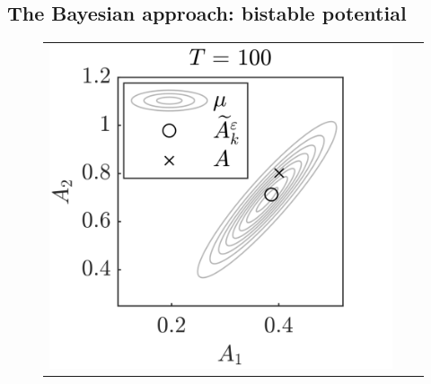 \documentclass[10pt]{article}
\begin{document}
\subsection{The Bayesian approach: bistable potential} \label{sec:Num_Bayes}
\begin{figure}[t]
	\centering
	\begin{tabular}{ccc}
		\includegraphics[]{Figures/Bayes_T100} & \in
\end{tabular}
\end{figure}
\end{document}
